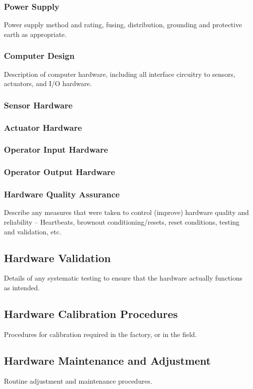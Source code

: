 \documentclass[11pt,a4paper]{article}
\begin{document}
\subsubsection{Power Supply}
Power supply method and rating, fusing, distribution, grounding and protective earth as appropriate.
\subsubsection{Computer Design}
Description of computer hardware, including all interface circuitry to sensors, actuators, and I/O hardware.
\subsubsection{Sensor Hardware}
\subsubsection{Actuator Hardware}
\subsubsection{Operator Input Hardware}
\subsubsection{Operator Output Hardware}
\subsubsection{Hardware Quality Assurance}
Describe any measures that were taken to control (improve) hardware quality and reliability – Heartbeats, brownout conditioning/resets, reset conditions, testing and validation, etc.

\subsection{Hardware Validation}
Details of any systematic testing to ensure that the hardware actually functions as intended.
\subsection{Hardware Calibration Procedures}
Procedures for calibration required in the factory, or in the field.
\subsection{Hardware Maintenance and Adjustment}
Routine adjustment and maintenance procedures.
\end{document}
